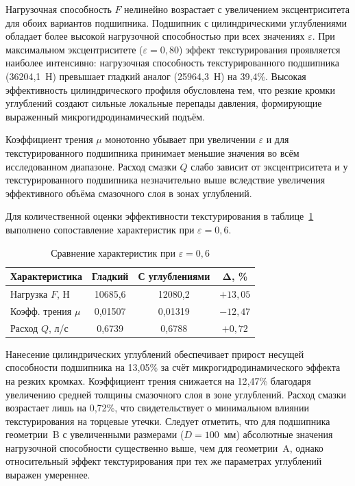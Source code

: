 Нагрузочная способность $F$ нелинейно возрастает с увеличением эксцентриситета для обоих вариантов подшипника. Подшипник с цилиндрическими углублениями обладает более высокой нагрузочной способностью при всех значениях $\varepsilon$. При максимальном эксцентриситете ($\varepsilon = 0{,}80$) эффект текстурирования проявляется наиболее интенсивно: нагрузочная способность текстурированного подшипника (36204{,}1~Н) превышает гладкий аналог (25964{,}3~Н) на 39{,}4\%. Высокая эффективность цилиндрического профиля обусловлена тем, что резкие кромки углублений создают сильные локальные перепады давления, формирующие выраженный микрогидродинамический подъём.

Коэффициент трения $\mu$ монотонно убывает при увеличении $\varepsilon$ и для текстурированного подшипника принимает меньшие значения во всём исследованном диапазоне. Расход смазки $Q$ слабо зависит от эксцентриситета и у текстурированного подшипника незначительно выше вследствие увеличения эффективного объёма смазочного слоя в зонах углублений.

Для количественной оценки эффективности текстурирования в таблице~\ref{tab:comparison} выполнено сопоставление характеристик при $\varepsilon = 0{,}6$.

\begin{table}[H]
\small
\centering
\caption{Сравнение характеристик при $\varepsilon = 0{,}6$}
\label{tab:comparison}
\begin{tabular}{|l|c|c|c|}
\hline
\textbf{Характеристика} & \textbf{Гладкий} & \textbf{С углублениями} & $\boldsymbol{\Delta}$\textbf{, \%} \\
\hline
Нагрузка $F$, Н & 10685{,}6 & 12080{,}2 & $+13{,}05$ \\
\hline
Коэфф. трения $\mu$ & 0{,}01507 & 0{,}01319 & $-12{,}47$ \\
\hline
Расход $Q$, л/с & 0{,}6739 & 0{,}6788 & $+0{,}72$ \\
\hline
\end{tabular}
\end{table}

Нанесение цилиндрических углублений обеспечивает прирост несущей способности подшипника на 13{,}05\% за счёт микрогидродинамического эффекта на резких кромках. Коэффициент трения снижается на 12{,}47\% благодаря увеличению средней толщины смазочного слоя в зоне углублений. Расход смазки возрастает лишь на 0{,}72\%, что свидетельствует о минимальном влиянии текстурирования на торцевые утечки. Следует отметить, что для подшипника геометрии~B с увеличенными размерами ($D = 100$~мм) абсолютные значения нагрузочной способности существенно выше, чем для геометрии~A, однако относительный эффект текстурирования при тех же параметрах углублений выражен умереннее.

